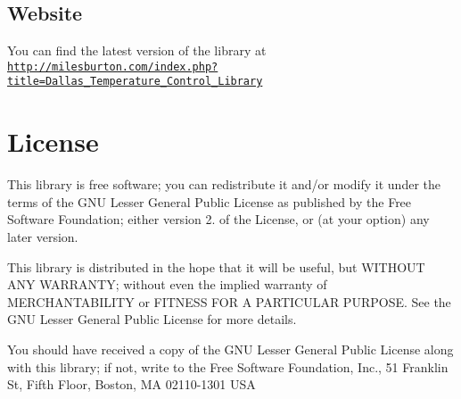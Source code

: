 \subsection*{Website}

You can find the latest version of the library at \href{http://milesburton.com/index.php?title=Dallas_Temperature_Control_Library}{\tt http\+://milesburton.\+com/index.\+php?title=\+Dallas\+\_\+\+Temperature\+\_\+\+Control\+\_\+\+Library}

\section*{License}

This library is free software; you can redistribute it and/or modify it under the terms of the G\+NU Lesser General Public License as published by the Free Software Foundation; either version 2. of the License, or (at your option) any later version.

This library is distributed in the hope that it will be useful, but W\+I\+T\+H\+O\+UT A\+NY W\+A\+R\+R\+A\+N\+TY; without even the implied warranty of M\+E\+R\+C\+H\+A\+N\+T\+A\+B\+I\+L\+I\+TY or F\+I\+T\+N\+E\+SS F\+OR A P\+A\+R\+T\+I\+C\+U\+L\+AR P\+U\+R\+P\+O\+SE. See the G\+NU Lesser General Public License for more details.

You should have received a copy of the G\+NU Lesser General Public License along with this library; if not, write to the Free Software Foundation, Inc., 51 Franklin St, Fifth Floor, Boston, MA 02110-\/1301 U\+SA 
